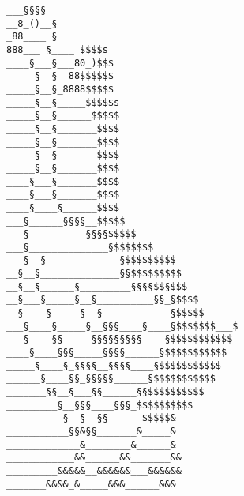 \documentclass{article}
\begin{document}
\vfill
\centering
\tiny
\begin{BVerbatim}
___§§§§
__8_()__§
_88____ §
888___ §____ $$$$s
____§___§___80_)$$$
_____§__§__88$$$$$$
_____§__§_8888$$$$$
_____§__§_____$$$$$s
_____§__§______$$$$$
_____§__§_______$$$$
_____§__§_______$$$$
_____§__§_______$$$$
_____§__§_______$$$$
____§___§_______$$$$
____§___§_______$$$$
____§____§______$$$$
___§______§§§§__$$$$$
___§__________§§§§$$$$$
___§______________§$$$$$$$
__ §_ §_____________§$$$$$$$$$
__§__§______________§§$$$$$$$$$
__§__§______§_________§§§§$$§$$$
__§___§_____§__§__________§§_§$$$$
__§____§_____§__§____________§$$$$$
___§____§_____§__§§§____§____§$$$$$$$___$
___§____§§_____§§§§§§§§§____§$$$$$$$$$$$
____§____§§§_____§§§§______§$$$$$$$$$$$
_____§____§_§§§§__§§§§____§$$$$$$$$$$$
______§____§§_§§§§§______§$$$$$$$$$$$
_______§§__§___§§______§§$$$$$$$$$$
_________§__§§§____§§§_$$$$$$$$$$
__________§__§__§§______$$$$$&
___________§§&§§_______&_____&
_____________&________&______&
____________&&______&&_______&&
_________&&&&&__&&&&&&___&&&&&&
_______&&&&_&_____&&&______&&&
\end{BVerbatim}
\end{document}
